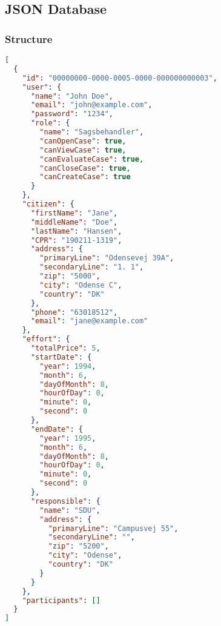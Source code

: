 \documentclass[../main.tex]{subfiles}
\begin{document}
\subsection{JSON Database}

\tocless\subsubsection{Structure}

\begin{lstlisting}[language=json, caption=cases.json, captionpos=b, label=cases.json]
[
  {
    "id": "00000000-0000-0005-0000-000000000003",
    "user": {
      "name": "John Doe",
      "email": "john@example.com",
      "password": "1234",
      "role": {
        "name": "Sagsbehandler",
        "canOpenCase": true,
        "canViewCase": true,
        "canEvaluateCase": true,
        "canCloseCase": true,
        "canCreateCase": true
      }
    },
    "citizen": {
      "firstName": "Jane",
      "middleName": "Doe",
      "lastName": "Hansen",
      "CPR": "190211-1319",
      "address": {
        "primaryLine": "Odensevej 39A",
        "secondaryLine": "1. 1",
        "zip": "5000",
        "city": "Odense C",
        "country": "DK"
      },
      "phone": "63018512",
      "email": "jane@example.com"
    },
    "effort": {
      "totalPrice": 5,
      "startDate": {
        "year": 1994,
        "month": 6,
        "dayOfMonth": 8,
        "hourOfDay": 0,
        "minute": 0,
        "second": 0
      },
      "endDate": {
        "year": 1995,
        "month": 6,
        "dayOfMonth": 8,
        "hourOfDay": 0,
        "minute": 0,
        "second": 0
      },
      "responsible": {
        "name": "SDU",
        "address": {
          "primaryLine": "Campusvej 55",
          "secondaryLine": "",
          "zip": "5200",
          "city": "Odense",
          "country": "DK"
        }
      }
    },
    "participants": []
  }
]
\end{lstlisting}
\end{document}
